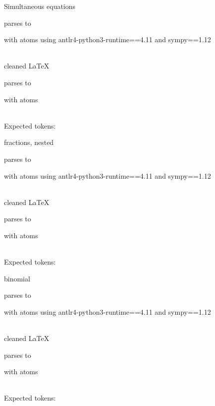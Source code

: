 \documentclass{article}
\begin{document}
\hrulefill

Simultaneous equations

parses to

with atoms
using antlr4-python3-runtime==4.11 and sympy==1.12

\ \\
cleaned \LaTeX

parses to

with atoms


\ \\
Expected tokens:



\hrulefill

fractions, nested

parses to

with atoms
using antlr4-python3-runtime==4.11 and sympy==1.12

\ \\
cleaned \LaTeX

parses to

with atoms


\ \\
Expected tokens:


\hrulefill

binomial

parses to

with atoms
using antlr4-python3-runtime==4.11 and sympy==1.12

\ \\
cleaned \LaTeX

parses to

with atoms


\ \\
Expected tokens:


\hrulefill
\end{document}
